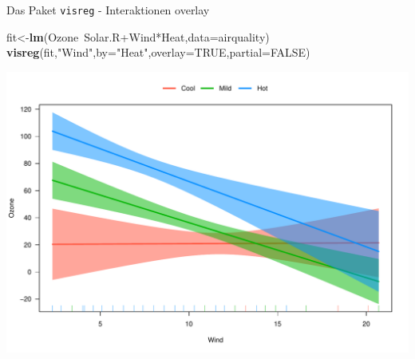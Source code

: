 \documentclass[ignorenonframetext,]{beamer}
\newenvironment{Shaded}{}{}
\newcommand{\KeywordTok}[1]{\textcolor[rgb]{0.00,0.44,0.13}{\textbf{{#1}}}}
\newcommand{\DataTypeTok}[1]{\textcolor[rgb]{0.56,0.13,0.00}{{#1}}}
\newcommand{\StringTok}[1]{\textcolor[rgb]{0.25,0.44,0.63}{{#1}}}
\newcommand{\OtherTok}[1]{\textcolor[rgb]{0.00,0.44,0.13}{{#1}}}
\newcommand{\NormalTok}[1]{{#1}}
\begin{document}
\begin{frame}[fragile]{Das Paket \texttt{visreg} - Interaktionen
overlay}

\begin{Shaded}
\begin{Highlighting}[]
\NormalTok{fit<-}\KeywordTok{lm}\NormalTok{(Ozone~Solar.R+Wind*Heat,}\DataTypeTok{data=}\NormalTok{airquality)}
\KeywordTok{visreg}\NormalTok{(fit,}\StringTok{"Wind"}\NormalTok{,}\DataTypeTok{by=}\StringTok{"Heat"}\NormalTok{,}\DataTypeTok{overlay=}\OtherTok{TRUE}\NormalTok{,}\DataTypeTok{partial=}\OtherTok{FALSE}\NormalTok{)}
\end{Highlighting}
\end{Shaded}

\includegraphics{R_intern_files/figure-beamer/unnamed-chunk-317-1.pdf}

\end{frame}
\end{document}
